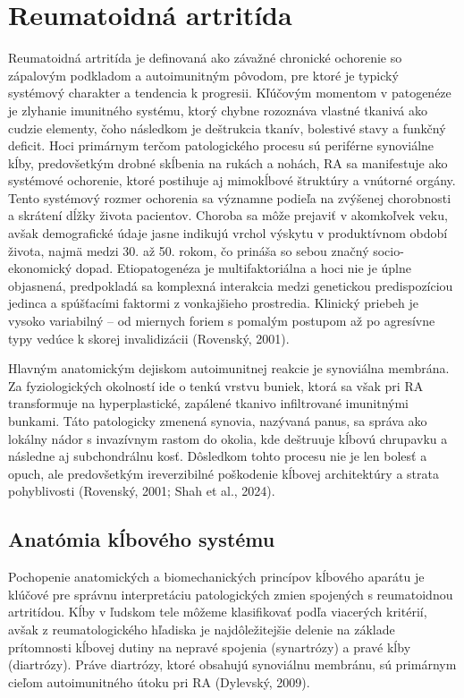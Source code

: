 \chapter{Reumatoidná artritída} Reumatoidná artritída je definovaná ako závažné chronické ochorenie so zápalovým podkladom a autoimunitným pôvodom, pre ktoré je typický systémový charakter a tendencia k progresii. Kľúčovým momentom v patogenéze je zlyhanie imunitného systému, ktorý chybne rozoznáva vlastné tkanivá ako cudzie elementy, čoho následkom je deštrukcia tkanív, bolestivé stavy a funkčný deficit. Hoci primárnym terčom patologického procesu sú periférne synoviálne kĺby, predovšetkým drobné skĺbenia na rukách a nohách, RA sa manifestuje ako systémové ochorenie, ktoré postihuje aj mimokĺbové štruktúry a vnútorné orgány. Tento systémový rozmer ochorenia sa významne podieľa na zvýšenej chorobnosti a skrátení dĺžky života pacientov. Choroba sa môže prejaviť v akomkoľvek veku, avšak demografické údaje jasne indikujú vrchol výskytu v produktívnom období života, najmä medzi 30. až 50. rokom, čo prináša so sebou značný socio-ekonomický dopad. Etiopatogenéza je multifaktoriálna a hoci nie je úplne objasnená, predpokladá sa komplexná interakcia medzi genetickou predispozíciou jedinca a spúšťacími faktormi z vonkajšieho prostredia. Klinický priebeh je vysoko variabilný – od miernych foriem s pomalým postupom až po agresívne typy vedúce k skorej invalidizácii (Rovenský, 2001). 

Hlavným anatomickým dejiskom autoimunitnej reakcie je synoviálna membrána. Za fyziologických okolností ide o tenkú vrstvu buniek, ktorá sa však pri RA transformuje na hyperplastické, zapálené tkanivo infiltrované imunitnými bunkami. Táto patologicky zmenená synovia, nazývaná panus, sa správa ako lokálny nádor s invazívnym rastom do okolia, kde deštruuje kĺbovú chrupavku a následne aj subchondrálnu kosť. Dôsledkom tohto procesu nie je len bolesť a opuch, ale predovšetkým ireverzibilné poškodenie kĺbovej architektúry a strata pohyblivosti (Rovenský, 2001; Shah et al., 2024). 

\section{Anatómia kĺbového systému}

Pochopenie anatomických a biomechanických princípov kĺbového aparátu je klúčové pre správnu interpretáciu patologických zmien spojených s reumatoidnou artritídou. Kĺby v ľudskom tele môžeme klasifikovať podľa viacerých kritérií, avšak z reumatologického hľadiska je najdôležitejšie delenie na základe prítomnosti kĺbovej dutiny na nepravé spojenia (synartrózy) a pravé kĺby (diartrózy). Práve diartrózy, ktoré obsahujú synoviálnu membránu, sú primárnym cieľom autoimunitného útoku pri RA (Dylevský, 2009).

